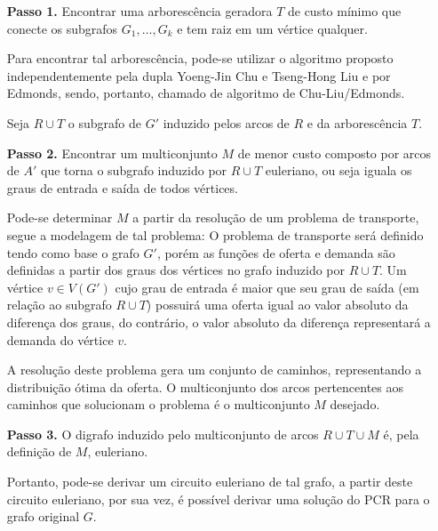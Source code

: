 \documentclass[12pt, a4paper]{article}
\begin{document}
	\begin{enumerate}
        \item[\textbf{Passo 1.}] 
			Encontrar uma arborescência geradora $T$ de custo mínimo que conecte os subgrafos $G_1, \dots, G_k$ e tem raiz em um vértice qualquer.

            Para encontrar tal arborescência, pode-se utilizar o algoritmo proposto independentemente pela dupla Yoeng-Jin Chu e Tseng-Hong Liu e por Edmonds\cite{edmonds-ssa}, sendo, portanto, chamado de algoritmo de Chu-Liu/Edmonds.

			Seja $R \cup T$ o subgrafo de $G'$ induzido pelos arcos de $R$ e da arborescência $T$.

        \item[\textbf{Passo 2.}]
            Encontrar um multiconjunto $M$ de menor custo composto por arcos de $A'$ que torna o subgrafo induzido por $R \cup T$ euleriano, ou seja iguala os graus de entrada e saída de todos vértices.

			Pode-se determinar $M$ a partir da resolução de um problema de transporte, segue a modelagem de tal problema: 
            O problema de transporte será definido tendo como base o grafo $G'$, porém as funções de oferta e demanda são definidas a partir dos graus dos vértices no grafo induzido por $R \cup T$.
            Um vértice $v \in V(G')$ cujo grau de entrada é maior que seu grau de saída (em relação ao subgrafo $R \cup T$) possuirá uma oferta igual ao valor absoluto da diferença dos graus, do contrário, o valor absoluto da diferença representará a demanda do vértice $v$.

			A resolução deste problema gera um conjunto de caminhos, representando a distribuição ótima da oferta. O multiconjunto dos arcos pertencentes aos caminhos que solucionam o problema é o multiconjunto $M$ desejado.

        \item[\textbf{Passo 3.}]
			O digrafo induzido pelo multiconjunto de arcos $R \cup T \cup M$ é, pela definição de $M$, euleriano. 
			
			Portanto, pode-se derivar um circuito euleriano de tal grafo, a partir deste circuito euleriano, por sua vez, é possível derivar uma solução do PCR para o grafo original $G$.
	\end{enumerate}
\end{document}
